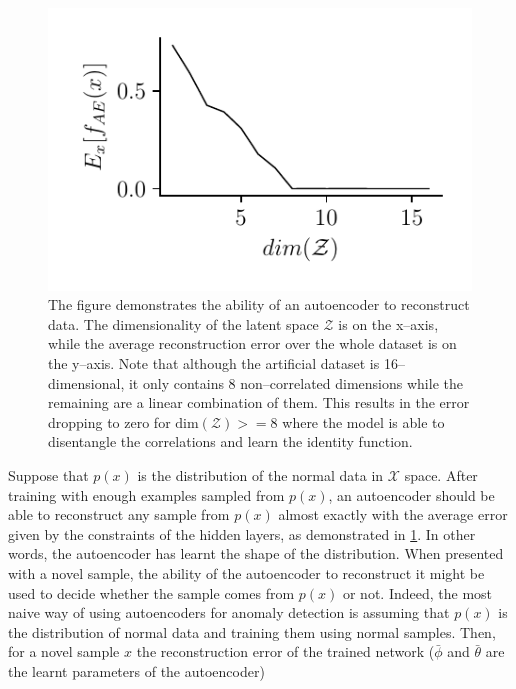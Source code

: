 \begin{figure}
\begin{centering}
\includegraphics[scale=0.85]{data/chapter_intro/ae_reconstruction}\caption{The figure demonstrates the ability of an autoencoder to reconstruct
data. The dimensionality of the latent space $\mathcal{Z}$ is on
the x--axis, while the average reconstruction error over the whole
dataset is on the y--axis. Note that although the artificial dataset
is 16--dimensional, it only contains 8 non--correlated dimensions
while the remaining are a linear combination of them. This results
in the error dropping to zero for $\text{dim}(\mathcal{Z})>=8$ where
the model is able to disentangle the correlations and learn the identity
function.}
\label{fig:ae_reconstruction}
\par\end{centering}
\end{figure}

Suppose that $p(x)$ is the distribution of the normal data in $\mathcal{X}$
space. After training with enough examples sampled from $p(x)$, an
autoencoder should be able to reconstruct any sample from $p(x)$
almost exactly with the average error given by the constraints of
the hidden layers, as demonstrated in \ref{fig:ae_reconstruction}.
In other words, the autoencoder has learnt the shape of the distribution.
When presented with a novel sample, the ability of the autoencoder
to reconstruct it might be used to decide whether the sample comes
from $p(x)$ or not. Indeed, the most naive way of using autoencoders
for anomaly detection is assuming that $p(x)$ is the distribution
of normal data and training them using normal samples. Then, for a
novel sample $x$ the reconstruction error of the trained network
($\bar{\phi}$ and $\bar{\theta}$ are the learnt parameters of the
autoencoder)

